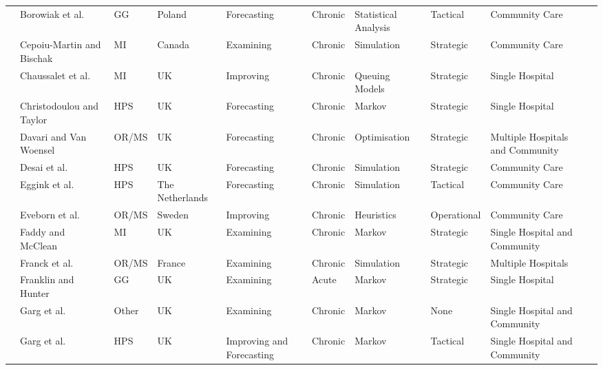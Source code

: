 \documentclass[thesis.tex]{subfiles}
\begin{document}
\begin{landscape}
\begin{table}[]
{\begin{tabular}{@{}llllllllll@{}}
  \cite{Borowiak} & Borowiak et al. &GG & Poland & Forecasting & Chronic &Statistical Analysis & Tactical & Community Care \\
  \cite{Cepoiu} & Cepoiu-Martin and Bischak & MI & Canada & Examining & Chronic & Simulation& Strategic & Community Care \\
 \cite{Chaussalet} & Chaussalet et al. & MI & UK & Improving& Chronic & Queuing Models & Strategic & Single Hospital \\
 \cite{Christodoulou} & Christodoulou and Taylor & HPS &UK & Forecasting &Chronic & Markov&Strategic &Single Hospital\\
  \cite{Davari} & Davari and Van Woensel & OR/MS  &UK& Forecasting &Chronic &Optimisation &Strategic & Multiple Hospitals and Community \\
  \cite{Desai} & Desai et al. & HPS  & UK & Forecasting & Chronic &Simulation & Strategic & Community Care\\
  \cite{Eggink} & Eggink et al. & HPS & The Netherlands & Forecasting & Chronic & Simulation & Tactical & Community Care\\
  \cite{Eveborn} & Eveborn et al. & OR/MS & Sweden & Improving& Chronic & Heuristics & Operational & Community Care\\
  \cite{Faddy} & Faddy and McClean & MI & UK & Examining & Chronic & Markov &Strategic &Single Hospital and Community\\
  \cite{Franck} & Franck et al. & OR/MS & France & Examining & Chronic & Simulation & Strategic & Multiple Hospitals \\
  \cite{Franklin} & Franklin and Hunter & GG & UK & Examining &Acute & Markov & Strategic&Single Hospital \\

  \cite{Garg1} & Garg et al. & Other & UK & Examining & Chronic & Markov & None & Single Hospital and Community \\
  \cite{Garg2} & Garg et al. & HPS & UK& Improving and Forecasting& Chronic & Markov&Tactical &Single Hospital and Community\\ 
  

\end{tabular}}
\end{table}
\end{landscape}
\end{document}
